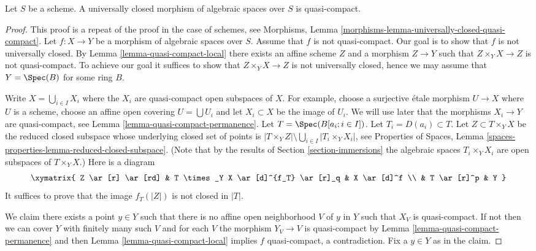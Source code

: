 \begin{lemma}
\label{lemma-universally-closed-quasi-compact}
Let $S$ be a scheme.
A universally closed morphism of algebraic spaces over $S$ is quasi-compact.
\end{lemma}

\begin{proof}
This proof is a repeat of the proof in the case of schemes, see
Morphisms, Lemma \ref{morphisms-lemma-universally-closed-quasi-compact}.
Let $f : X \to Y$ be a morphism of algebraic spaces over $S$.
Assume that $f$ is not quasi-compact.
Our goal is to show that $f$ is not universally closed. By
Lemma \ref{lemma-quasi-compact-local}
there exists an affine scheme $Z$ and a morphism $Z \to Y$
such that $Z \times_Y X \to Z$ is not quasi-compact. To achieve our goal
it suffices to show that $Z \times_Y X \to Z$ is not universally closed,
hence we may assume that $Y = \Spec(B)$ for some ring $B$.

\medskip\noindent
Write $X = \bigcup_{i \in I} X_i$ where the $X_i$ are quasi-compact
open subspaces of $X$. For example, choose a surjective \'etale morphism
$U \to X$ where $U$ is a scheme, choose an affine open covering
$U = \bigcup U_i$ and let $X_i \subset X$ be the image of $U_i$.
We will use later that the morphisms $X_i \to Y$ are quasi-compact, see
Lemma \ref{lemma-quasi-compact-permanence}.
Let $T = \Spec(B[a_i ; i \in I])$. Let $T_i = D(a_i) \subset T$.
Let $Z \subset T \times_Y X$ be the reduced closed subspace whose underlying
closed set of points is
$|T \times_Y Z| \setminus \bigcup_{i \in I} |T_i \times_Y X_i|$, see
Properties of Spaces,
Lemma \ref{spaces-properties-lemma-reduced-closed-subspace}.
(Note that by the results of
Section \ref{section-immersions}
the algebraic spaces $T_i \times_Y X_i$ are open subspaces of $T \times_Y X$.)
Here is a diagram
$$
\xymatrix{
Z \ar[r] \ar[rd] &
T \times_Y X \ar[d]^{f_T} \ar[r]_q &
X \ar[d]^f \\
& T \ar[r]^p & Y
}
$$
It suffices to prove that the image $f_T(|Z|)$ is not closed in $|T|$.

\medskip\noindent
We claim there exists a point $y \in Y$ such that there is no
affine open neighborhood $V$ of $y$ in $Y$ such that $X_V$ is quasi-compact.
If not then we can cover $Y$ with finitely many such $V$ and for
each $V$ the morphism $Y_V \to V$ is quasi-compact by
Lemma \ref{lemma-quasi-compact-permanence}
and then
Lemma \ref{lemma-quasi-compact-local}
implies $f$ quasi-compact, a contradiction. Fix a $y \in Y$ as in the claim.


\end{proof}
